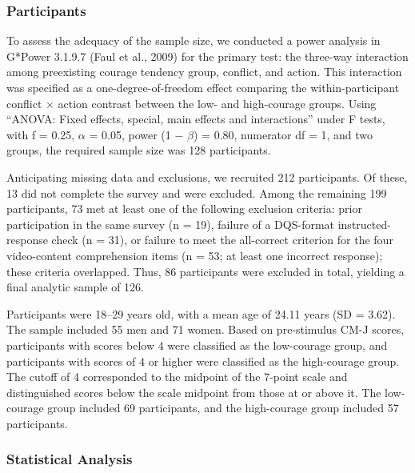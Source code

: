 \documentclass[utf8]{FrontiersinHarvard}
\begin{document}
\subsubsection{Participants}\label{participants-1}

To assess the adequacy of the sample size, we conducted a power analysis in G*Power 3.1.9.7 (Faul et al., 2009) for the primary test: the three-way interaction among preexisting courage tendency group, conflict, and action. This interaction was specified as a one-degree-of-freedom effect comparing the within-participant conflict $\times$ action contrast between the low- and high-courage groups. Using ``ANOVA: Fixed effects, special, main effects and interactions'' under F tests, with f = 0.25, $\alpha$ = 0.05, power (1 $-$ $\beta$) = 0.80, numerator df = 1, and two groups, the required sample size was 128 participants.

Anticipating missing data and exclusions, we recruited 212 participants. Of these, 13 did not complete the survey and were excluded. Among the remaining 199 participants, 73 met at least one of the following exclusion criteria: prior participation in the same survey (n = 19), failure of a DQS-format instructed-response check (n = 31), or failure to meet the all-correct criterion for the four video-content comprehension items (n = 53; at least one incorrect response); these criteria overlapped. Thus, 86 participants were excluded in total, yielding a final analytic sample of 126.

Participants were 18--29 years old, with a mean age of 24.11 years (SD = 3.62). The sample included 55 men and 71 women. Based on pre-stimulus CM-J scores, participants with scores below 4 were classified as the low-courage group, and participants with scores of 4 or higher were classified as the high-courage group. The cutoff of 4 corresponded to the midpoint of the 7-point scale and distinguished scores below the scale midpoint from those at or above it. The low-courage group included 69 participants, and the high-courage group included 57 participants.

\subsubsection{Statistical Analysis}\label{statistical-analysis-1}
\end{document}
